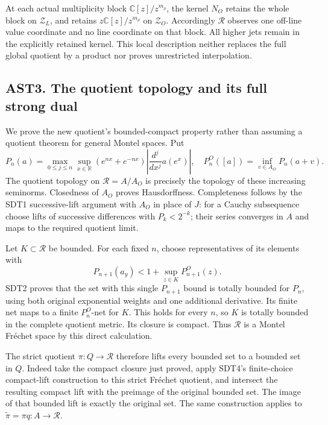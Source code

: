 At each actual multiplicity block \(\mathbb C[z]/z^{m_\rho}\), the
kernel \(N_O\) retains the whole block on \(\mathscr Z_L\), and retains
\(z\mathbb C[z]/z^{m_\rho}\) on \(\mathscr Z_O\). Accordingly
\(\mathcal R\) observes one off-line value coordinate and no line
coordinate on that block. All higher jets remain in the explicitly
retained kernel. This local description neither replaces the full global
quotient by a product nor proves unrestricted interpolation.

\subsection{AST3. The quotient topology and its full strong
dual}\label{ast3.-the-quotient-topology-and-its-full-strong-dual}

We prove the new quotient's bounded-compact property rather than
assuming a quotient theorem for general Montel spaces. Put \[
P_n(a)=\max_{0\le j\le n}\sup_{x\in\mathbb R}
(e^{nx}+e^{-nx})\left|\frac{d^j}{dx^j}a(e^x)\right|,
\quad
P_n^O([a])=\inf_{v\in A_O}P_n(a+v).
\tag{AST3.1}
\] The quotient topology on \(\mathcal R=A/A_O\) is precisely the
topology of these increasing seminorms. Closedness of \(A_O\) proves
Hausdorffness. Completeness follows by the SDT1 successive-lift argument
with \(A_O\) in place of \(J\): for a Cauchy subsequence choose lifts of
successive differences with \(P_k<2^{-k}\); their series converges in
\(A\) and maps to the required quotient limit.

Let \(K\subset\mathcal R\) be bounded. For each fixed \(n\), choose
representatives of its elements with \[
P_{n+1}(a_y)<1+\sup_{z\in K}P_{n+1}^O(z).
\tag{AST3.2}
\] SDT2 proves that the set with this single \(P_{n+1}\) bound is
totally bounded for \(P_n\), using both original exponential weights and
one additional derivative. Its finite net maps to a finite \(P_n^O\)-net
for \(K\). This holds for every \(n\), so \(K\) is totally bounded in
the complete quotient metric. Its closure is compact. Thus
\(\mathcal R\) is a Montel Fréchet space by this direct calculation.

The strict quotient \(\pi:Q\to\mathcal R\) therefore lifts every bounded
set to a bounded set in \(Q\). Indeed take the compact closure just
proved, apply SDT4's finite-choice compact-lift construction to this
strict Fréchet quotient, and intersect the resulting compact lift with
the preimage of the original bounded set. The image of that bounded lift
is exactly the original set. The same construction applies to
\(\widetilde\pi=\pi q:A\to\mathcal R\).

